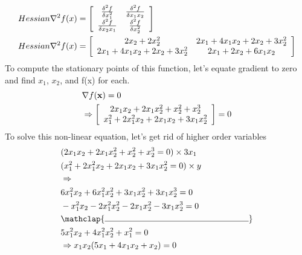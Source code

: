 \documentclass[a4paper,10pt]{article}
\begin{document}
\begin{enumerate}
    \begin{equation}
        \begin{split}
          Hessian \nabla^2f(x) & = \left[\begin{array}{c c} \frac{\delta^2f}{\delta x_1^2} &\frac{\delta^2f}{\delta x_1x_2}  \\  \frac{\delta^2f}{\delta x_2x_1}  &\frac{\delta^2f}{\delta x_2^2} \end{array} \right] \\
          Hessian \nabla^2f(x) & = \left[\begin{array}{c c} 2x_2 + 2x_2^2  &2x_1 + 4x_1x_2 + 2x_2 + 3x_2^2  \\  2x_1 + 4x_1x_2 + 2x_2 + 3x_2^2  &2x_1 + 2x_2 + 6x_1x_2 \end{array} \right]
        \end{split}
    \end{equation}
    To compute the stationary points of this function, let's equate gradient to zero and find $x_1$, $x_2$, and f(x) for each.
    \begin{equation}
        \begin{split}
          & \nabla f(\mathbf{x}) = 0 \\
          & \Rightarrow \left[\begin{array}{c c} 2x_1x_2 + 2x_1x_2^2 + x_2^2 + x_2^3 \\ x_1^2 + 2x_1^2x_2 + 2x_1x_2 + 3x_1x_2^2 \end{array} \right] = 0 \\
        \end{split}
    \end{equation}
    To solve this non-linear equation, let's get rid of higher order variables 
    \begin{equation}
        \begin{split}
           & (2x_1x_2 + 2x_1x_2^2 + x_2^2 + x_2^3 = 0) \times 3x_1\\
          & (x_1^2 + 2x_1^2x_2 + 2x_1x_2 + 3x_1x_2^2 = 0) \times y \\
          & \Rightarrow \\
          & 6x_1^2x_2 + 6x_1^2x_2^2 + 3x_1x_2^2 + 3x_1x_2^3 = 0 \\
          & -x_1^2x_2 - 2x_1^2x_2^2 - 2x_1x_2^2 - 3x_1x_2^3 = 0 \\
          & \mathclap{\rule{6cm}{0.4pt}}\\
          & 5x_1^2x_2 + 4x_1^2x_2^2 + x_1^2 = 0 \\ 
          & \Rightarrow x_1x_2(5x_1 + 4x_1x_2 + x_2) = 0 

\end{split}
\end{equation}
\end{enumerate}
\end{document}
